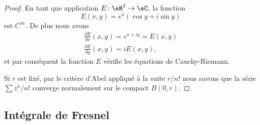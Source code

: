 \begin{proof}
    En tant que application \( E\colon \eR^2\to \eC\), la fonction
    \begin{equation}
        E(x,y)=e^x(\cos y+i\sin y)
    \end{equation}
    est \( C^{\infty}\). De plus nous avons
    \begin{subequations}
        \begin{align}
            \frac{ \partial E }{ \partial x }(x,y)= e^{x+iy}=E(x,y)\\
            \frac{ \partial E }{ \partial y }(x,y)=iE(x,y),
        \end{align}
    \end{subequations}
    et par conséquent la fonction \( E\) vérifie les équations de Cauchy-Riemann.

    Si \( r\) est fixé, par le critère d'Abel appliqué à la suite \(r/n!\) nous savons que la série \( \sum z^n/n!\) converge normalement sur le compact \( B(0,r)\).
\end{proof}

\subsection{Intégrale de Fresnel}

